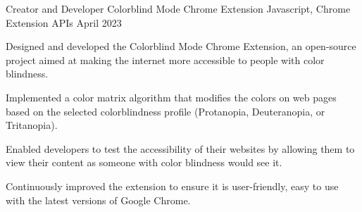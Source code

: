 \begin{cventries}
  
  \cventry
  {Creator and Developer} %
  {Colorblind Mode Chrome Extension} %
  {Javascript, Chrome Extension APIs} %
  {April 2023} %
  {
    \begin{cvitems} %
      \item {Designed and developed the Colorblind Mode Chrome Extension, an open-source project aimed at making the internet more accessible to people with color blindness.}
      \item {Implemented a color matrix algorithm that modifies the colors on web pages based on the selected colorblindness profile (Protanopia, Deuteranopia, or Tritanopia).}
      \item {Enabled developers to test the accessibility of their websites by allowing them to view their content as someone with color blindness would see it.}
      \item {Continuously improved the extension to ensure it is user-friendly, easy to use with the latest versions of Google Chrome.}
    \end{cvitems}
  }


\end{cventries}
